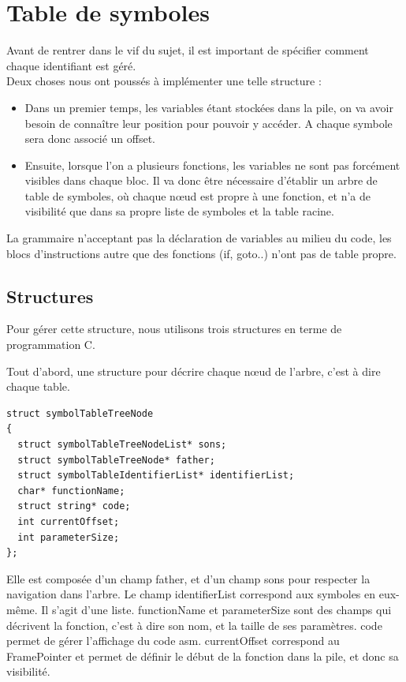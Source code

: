 \section{Table de symboles}

Avant de rentrer dans le vif du sujet, il est important de spécifier comment chaque identifiant est géré.\\ Deux choses nous ont poussés à implémenter une telle structure :
\begin{itemize}
\item Dans un premier temps, les variables étant stockées dans la pile, on va avoir besoin de connaître leur position pour pouvoir y accéder. A chaque symbole sera donc associé un offset.
\item Ensuite, lorsque l'on a plusieurs fonctions, les variables ne sont pas forcément visibles dans chaque bloc. Il va donc être nécessaire d'établir un arbre de table de symboles, où chaque n\oe{}ud est propre à une fonction, et n'a de visibilité que dans sa propre liste de symboles et la table racine.
\end{itemize}

La grammaire n'acceptant pas la déclaration de variables au milieu du code, les blocs d'instructions autre que des fonctions (if, goto..) n'ont pas de table propre.

\subsection*{Structures}

Pour gérer cette structure, nous utilisons trois structures en terme de programmation C.

Tout d'abord, une structure pour décrire chaque n\oe{}ud de l'arbre, c'est à dire chaque table. 

\begin{verbatim}
struct symbolTableTreeNode
{
  struct symbolTableTreeNodeList* sons;
  struct symbolTableTreeNode* father;
  struct symbolTableIdentifierList* identifierList;
  char* functionName;
  struct string* code;
  int currentOffset;
  int parameterSize;
};
\end{verbatim} 

Elle est composée d'un champ father, et d'un champ sons pour respecter la navigation dans l'arbre. 
Le champ identifierList correspond aux symboles en eux-même. Il s'agit d'une liste. 
functionName et parameterSize sont des champs qui décrivent la fonction, c'est à dire son nom, et la taille de ses paramètres.
code permet de gérer l'affichage du code asm.
currentOffset correspond au FramePointer et permet de définir le début de la fonction dans la pile, et donc sa visibilité.


